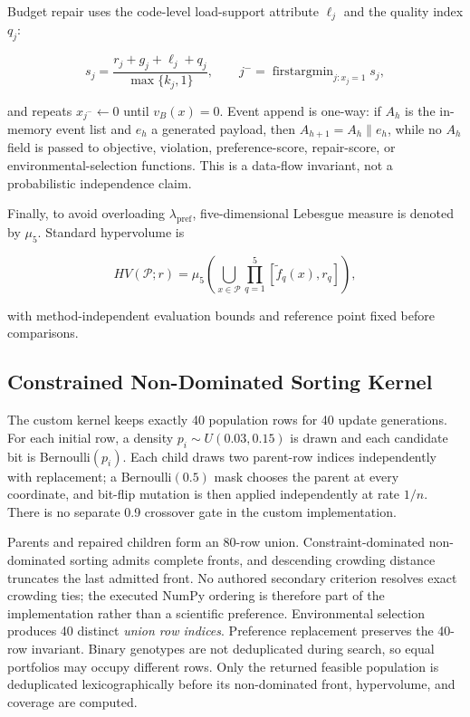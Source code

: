 \documentclass[energies,article,submit,moreauthors]{Definitions/mdpi}
\begin{document}
Budget repair uses the code-level load-support attribute \(\ell_j\) and the quality index \(q_j\):

\[
s_j=\frac{r_j+g_j+\ell_j+q_j}{\max\{k_j,1\}},
\qquad
j^-=\operatorname{firstargmin}_{j:x_j=1}s_j,
\]

and repeats \(x_{j^-}\leftarrow0\) until \(v_B(x)=0\). Event append is one-way: if \(A_h\) is the in-memory event list and \(e_h\) a generated payload, then \(A_{h+1}=A_h\mathbin{\|}e_h\), while no \(A_h\) field is passed to objective, violation, preference-score, repair-score, or environmental-selection functions. This is a data-flow invariant, not a probabilistic independence claim.

Finally, to avoid overloading \(\lambda_{\mathrm{pref}}\), five-dimensional Lebesgue measure is denoted by \(\mu_5\). Standard hypervolume is

\[
HV(\mathcal P;r)=\mu_5\!\left(
\bigcup_{x\in\mathcal P}\prod_{q=1}^{5}[\tilde f_q(x),r_q]\right),
\]

with method-independent evaluation bounds and reference point fixed before comparisons.

\subsection{Constrained Non-Dominated Sorting Kernel}\label{constrained-non-dominated-sorting-kernel}

The custom kernel keeps exactly 40 population rows for 40 update generations. For each initial row, a density \(p_i\sim U(0.03,0.15)\) is drawn and each candidate bit is Bernoulli\((p_i)\). Each child draws two parent-row indices independently with replacement; a Bernoulli\((0.5)\) mask chooses the parent at every coordinate, and bit-flip mutation is then applied independently at rate \(1/n\). There is no separate 0.9 crossover gate in the custom implementation.

Parents and repaired children form an 80-row union. Constraint-dominated non-dominated sorting admits complete fronts, and descending crowding distance truncates the last admitted front. No authored secondary criterion resolves exact crowding ties; the executed NumPy ordering is therefore part of the implementation rather than a scientific preference. Environmental selection produces 40 distinct \emph{union row indices}. Preference replacement preserves the 40-row invariant. Binary genotypes are not deduplicated during search, so equal portfolios may occupy different rows. Only the returned feasible population is deduplicated lexicographically before its non-dominated front, hypervolume, and coverage are computed.
\end{document}
